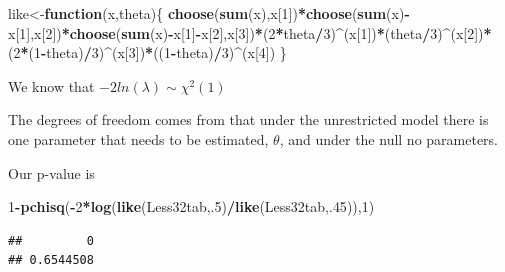 \documentclass[]{book}
\newenvironment{Shaded}{\begin{snugshade}}{\end{snugshade}}
\newcommand{\KeywordTok}[1]{\textcolor[rgb]{0.13,0.29,0.53}{\textbf{#1}}}
\newcommand{\DecValTok}[1]{\textcolor[rgb]{0.00,0.00,0.81}{#1}}
\newcommand{\ControlFlowTok}[1]{\textcolor[rgb]{0.13,0.29,0.53}{\textbf{#1}}}
\newcommand{\OperatorTok}[1]{\textcolor[rgb]{0.81,0.36,0.00}{\textbf{#1}}}
\newcommand{\NormalTok}[1]{#1}
\theoremstyle{definition}
\theoremstyle{definition}
\theoremstyle{definition}
\theoremstyle{remark}
\begin{document}
\begin{Shaded}
\begin{Highlighting}[]
\NormalTok{like<-}\ControlFlowTok{function}\NormalTok{(x,theta)\{}
    \KeywordTok{choose}\NormalTok{(}\KeywordTok{sum}\NormalTok{(x),x[}\DecValTok{1}\NormalTok{])}\OperatorTok{*}\KeywordTok{choose}\NormalTok{(}\KeywordTok{sum}\NormalTok{(x)}\OperatorTok{-}\NormalTok{x[}\DecValTok{1}\NormalTok{],x[}\DecValTok{2}\NormalTok{])}\OperatorTok{*}\KeywordTok{choose}\NormalTok{(}\KeywordTok{sum}\NormalTok{(x)}\OperatorTok{-}\NormalTok{x[}\DecValTok{1}\NormalTok{]}\OperatorTok{-}\NormalTok{x[}\DecValTok{2}\NormalTok{],x[}\DecValTok{3}\NormalTok{])}\OperatorTok{*}\NormalTok{(}\DecValTok{2}\OperatorTok{*}\NormalTok{theta}\OperatorTok{/}\DecValTok{3}\NormalTok{)}\OperatorTok{^}\NormalTok{(x[}\DecValTok{1}\NormalTok{])}\OperatorTok{*}\NormalTok{(theta}\OperatorTok{/}\DecValTok{3}\NormalTok{)}\OperatorTok{^}\NormalTok{(x[}\DecValTok{2}\NormalTok{])}\OperatorTok{*}\NormalTok{(}\DecValTok{2}\OperatorTok{*}\NormalTok{(}\DecValTok{1}\OperatorTok{-}\NormalTok{theta)}\OperatorTok{/}\DecValTok{3}\NormalTok{)}\OperatorTok{^}\NormalTok{(x[}\DecValTok{3}\NormalTok{])}\OperatorTok{*}\NormalTok{((}\DecValTok{1}\OperatorTok{-}\NormalTok{theta)}\OperatorTok{/}\DecValTok{3}\NormalTok{)}\OperatorTok{^}\NormalTok{(x[}\DecValTok{4}\NormalTok{])}
\NormalTok{\}}
\end{Highlighting}
\end{Shaded}

We know that \(-2ln(\lambda) \sim \chi^{2}(1)\)

The degrees of freedom comes from that under the unrestricted model
there is one parameter that needs to be estimated, \(\theta\), and under
the null no parameters.

Our p-value is

\begin{Shaded}
\begin{Highlighting}[]
\DecValTok{1}\OperatorTok{-}\KeywordTok{pchisq}\NormalTok{(}\OperatorTok{-}\DecValTok{2}\OperatorTok{*}\KeywordTok{log}\NormalTok{(}\KeywordTok{like}\NormalTok{(Less32tab,.}\DecValTok{5}\NormalTok{)}\OperatorTok{/}\KeywordTok{like}\NormalTok{(Less32tab,.}\DecValTok{45}\NormalTok{)),}\DecValTok{1}\NormalTok{)}
\end{Highlighting}
\end{Shaded}

\begin{verbatim}
##         0 
## 0.6544508
\end{verbatim}
\end{document}
